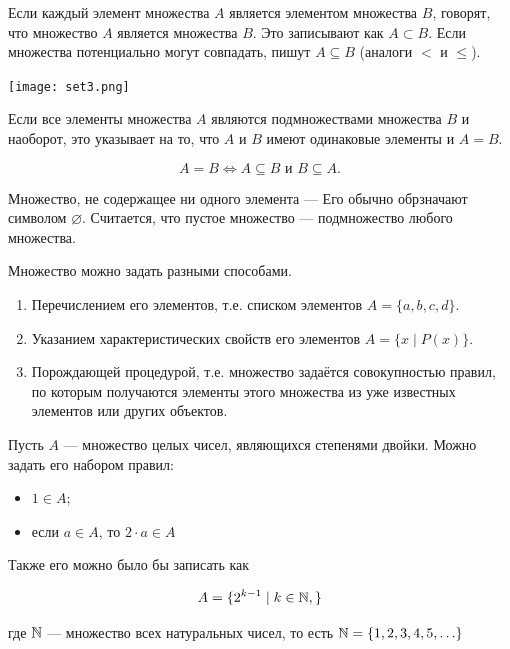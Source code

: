 \documentclass[12pt, a4paper]{article}
\begin{document}
\begin{mydef}
Если каждый элемент множества $A$ является элементом множества $B$, говорят, что множество $A$ является  множества $B$. Это записывают как $A \subset B.$ Если множества потенциально могут совпадать, пишут $A \subseteq B$ (аналоги $<$ и $\leq$).  
\end{mydef}

\begin{center}
    \texttt{[image: set3.png]}
\end{center}

Если все элементы множества $A$ являются подмножествами множества $B$ и наоборот, это указывает на то, что $A$ и $B$ имеют одинаковые элементы и $A = B$.

\[ 
A = B  \Leftrightarrow A \subseteq B \text{ и } B \subseteq A.
\]

Множество, не содержащее ни одного элемента ---  Его обычно обрзначают символом $\varnothing.$ Считается, что пустое множество --- подмножество любого множества. 
 
Множество можно задать разными способами.

\begin{enumerate}
    \item Перечислением его элементов, т.е. списком элементов $A = \{a,b,c,d\}.$
    \item Указанием характеристических свойств его элементов $A = \{x \mid P(x)\}.$
    \item Порождающей процедурой, т.е. множество задаётся совокупностью правил, по которым получаются элементы этого множества из уже известных элементов или других объектов.
\end{enumerate}

\begin{myex} 
Пусть $A$ --- множество целых чисел, являющихся степенями двойки. Можно задать его набором правил:
     \begin{itemize}
         \item $1 \in A$;
         \item если $a \in A$, то $2 \cdot a \in A$
     \end{itemize}

Также его можно было бы записать как 

\[
A = \{2^{k - 1} \mid k \in \mathbb N,\}
\]

где $\mathbb N$ --- множество всех натуральных чисел, то есть $\mathbb N = \{1, 2, 3, 4, 5, \ldots \}$
\end{myex} 
\end{document}
